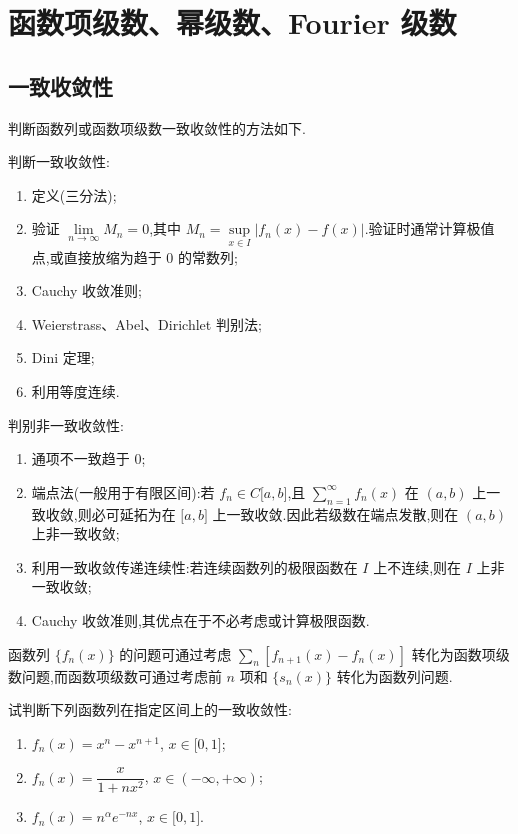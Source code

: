 \setcounter{chapter}{8}
\pagestyle{fancy}

\chapter{函数项级数、幂级数、Fourier 级数}


\section{一致收敛性}

判断函数列或函数项级数一致收敛性的方法如下.

判断一致收敛性:
\begin{enumerate}
    \item 定义(三分法);
    \item 验证 $\displaystyle\lim\limits_{n\to\infty}M_n=0$,其中
          $M_n=\displaystyle\sup\limits_{x\in I}|f_n(x)-f(x)|$.验证时通常计算极值点,或直接放缩为趋于 $0$ 的常数列;
    \item Cauchy 收敛准则;
    \item Weierstrass、Abel、Dirichlet 判别法;
    \item Dini 定理;
    \item 利用等度连续.
\end{enumerate}

判别非一致收敛性:
\begin{enumerate}
    \item 通项不一致趋于 $0$;
    \item 端点法(一般用于有限区间):若 $f_n\in C\lbrack a,b\rbrack$,且 $\displaystyle\sum\limits_{n=1}^{\infty}f_n(x)$ 在 $(a,b)$ 上一致收敛,则必可延拓为在 $\lbrack a,b\rbrack$ 上一致收敛.因此若级数在端点发散,则在 $(a,b)$ 上非一致收敛;
    \item 利用一致收敛传递连续性:若连续函数列的极限函数在 $I$ 上不连续,则在 $I$ 上非一致收敛;
    \item Cauchy 收敛准则,其优点在于不必考虑或计算极限函数.
\end{enumerate}

\begin{remark}
    函数列 $\{f_n(x)\}$ 的问题可通过考虑 $\displaystyle\sum\limits_n[f_{n+1}(x)-f_n(x)]$ 转化为函数项级数问题,而函数项级数可通过考虑前 $n$ 项和 $\{s_n(x)\}$ 转化为函数列问题.
\end{remark}

\begin{example}
    试判断下列函数列在指定区间上的一致收敛性:
    \begin{enumerate}
        \item $f_n(x)=x^n-x^{n+1}$, $x\in\lbrack 0,1\rbrack$;
        \item $f_n(x)=\dfrac{x}{1+nx^2}$, $x\in(-\infty,+\infty)$;
        \item $f_n(x)=n^\alpha e^{-nx}$, $x\in\lbrack 0,1\rbrack$.
    \end{enumerate}
\end{example}
\exampleblank

